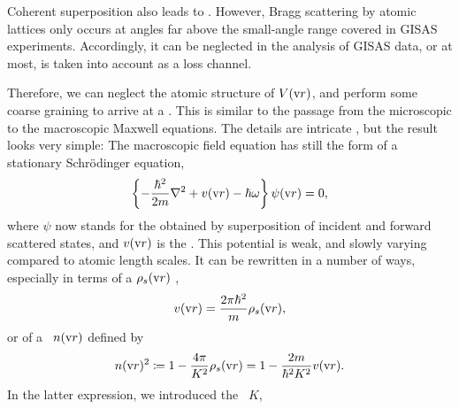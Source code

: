 Coherent superposition also leads to .
%
However, Bragg scattering by atomic lattices only occurs at angles
far above the small-angle range covered in GISAS experiments.
Accordingly, it can be neglected in the analysis of GISAS data,
or at most, is taken into account as a loss channel.

Therefore,
we can neglect the atomic structure of $V(\text{v}{r})$,
and perform some coarse graining to
arrive at a .
%
This is 
similar to the passage from
the microscopic to the macroscopic Maxwell equations.
The details are intricate \cite{Sea89,Lax51},
but the result \cite[eq.~2.8.32]{Sea89} looks very simple:
The macroscopic field equation
has still the form of a stationary Schrödinger equation,
%
\begin{equation}\label{EmacrSchrodi}
  \left\{-\frac{\hbar^2}{2m}\mathbf{\nabla}^2+v(\text{v}{r})-\hbar\omega\right\} \psi(\text{v}{r}) = 0,
\end{equation}
%
%
where $\psi$ now stands for the 
%
%
obtained by superposition of
incident and forward scattered states,
and $v(\text{v}{r})$ is the .
%
This potential is weak, and slowly varying compared to atomic length scales.
It can be rewritten in a number of ways,
especially in terms of a
%
$\rho_s(\text{v}{r})$ \cite[eq.\ 2.8.37]{Sea89},
%
\begin{equation}
  v(\text{v}{r})=\frac{2\pi \hbar^2}{m}\rho_s(\text{v}{r}),  
\end{equation}
or of a ~$n(\text{v}{r})$
%
%
defined by
\begin{equation}\label{EnRefrIndx}
  n(\text{v}{r})^2\coloneqq 1-\frac{4\pi}{K^2}\rho_s(\text{v}{r}) = 1 -\frac{2m}{\hbar^2 K^2}v(\text{v}{r}).
\end{equation}
In the latter expression,
we introduced the ~$K$,
%
